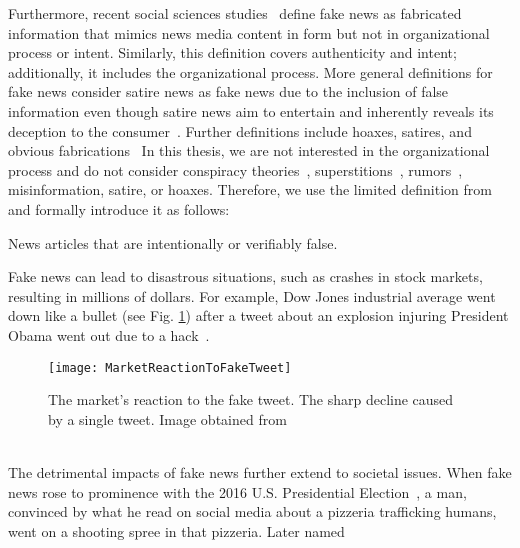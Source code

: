 Furthermore, recent social sciences studies~\parencite{TheScienceOfFakeNews_Lazer, ThePsycologyOfFakeNews_Pennycook} define fake news as fabricated information that mimics news media content in form but not in organizational process or intent. Similarly, this definition covers authenticity and intent; additionally, it includes the organizational process. More general definitions for fake news consider satire news as fake news due to the inclusion of false information even though satire news aim to entertain and inherently reveals its deception to the consumer~\parencite{WhenFakeNewsBecomesReal_Balmas, TheImpactOfRealNewsAboutFakeNews_Brewer, NewsVerificationByExploitingConflictingSocialViewpoints_Jin, FakeNewsOrTruthUsingSatiricalCues_Rubin}. Further definitions include hoaxes, satires, and obvious
fabrications~\parencite{DeceptionDetectionForFakeNews3TypesOfFakeNews_Rubin}
In this thesis, we are not interested in the organizational process and do not consider conspiracy theories~\parencite{ConspiracyTheories_Sunstein}, superstitions~\parencite{Superstition_Lindeman}, rumors~\parencite{RumorsAndHealthCareReform_Berinsky}, misinformation, satire, or hoaxes. Therefore, we use the limited definition from~\parencite{SocialMediaAndFakeNewsIn2016Election_Allcott} and formally introduce it as follows:
\begin{definition}
    News articles that are intentionally or verifiably false.
\end{definition}
Fake news can lead to disastrous situations, such as crashes in stock markets, resulting in millions of dollars. For example, Dow Jones
industrial average went down like a bullet (see Fig. \ref{fig:MarketReactionToFakeTweet}) after a tweet about an explosion injuring President Obama
went out due to a hack~\parencite{MarketQuaversAfterFakeAPTweet_ElBoghdady}.
\begin{figure}
    \centering
    \texttt{[image: MarketReactionToFakeTweet]}
    \caption[Market Reaction to Fake Tweet]{The market's reaction to the fake tweet. The sharp decline caused by a single tweet. Image obtained from~\parencite{MarketQuaversAfterFakeAPTweet_ElBoghdady}}\label{fig:MarketReactionToFakeTweet}
\end{figure}\\
The detrimental impacts of fake news further extend to societal issues.
When fake news rose to prominence with the 2016 U.S. Presidential Election~\parencite{USPresidentialElection2016}, a man, convinced by what he
read on social media about a pizzeria trafficking humans, went on a shooting spree in that pizzeria. Later named

